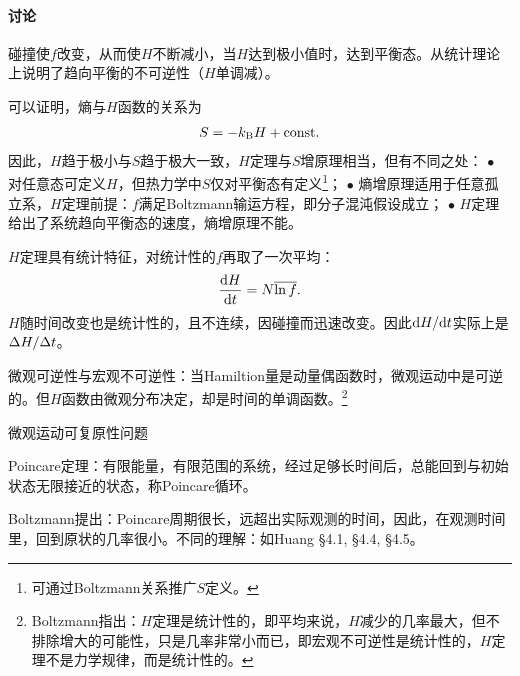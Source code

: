 \paragraph*{讨论}
\begin{compactenum}
	\item 碰撞使$f$改变，从而使$H$不断减小，当$H$达到极小值时，达到平衡态。从统计理论上说明了趋向平衡的不可逆性（$H$单调减）。
	\item 可以证明，熵与$H$函数的关系为
	\begin{align}
		S=-k_{\mathrm B} H+\mathrm{const}.
	\end{align}
	因此，$H$趋于极小与$S$趋于极大一致，$H$定理与$S$增原理相当，但有不同之处：
		\subitem $\bullet$ 对任意态可定义$H$，但热力学中$S$仅对平衡态有定义\footnote{可通过Boltzmann关系推广$S$定义。}；
		\subitem $\bullet$ 熵增原理适用于任意孤立系，$H$定理前提：$f$满足Boltzmann输运方程，即分子混沌假设成立；
		\subitem $\bullet$ $H$定理给出了系统趋向平衡态的速度，熵增原理不能。
	\item $H$定理具有统计特征，对统计性的$f$再取了一次平均：
	\[
		\frac{\mathrm{d}^{\;\!\!}H}{\mathrm{d} t^{\;\!\!}}=N\overline{\ln f}.
	\]
	$H$随时间改变也是统计性的，且不连续，因碰撞而迅速改变。因此$\mathop{}\!\mathrm{d} H/\mathrm{d} t$实际上是$\Delta H/\Delta t$。
	\item 微观可逆性与宏观不可逆性：当Hamiltion量是动量偶函数时，微观运动中是可逆的。但$H$函数由微观分布决定，却是时间的单调函数。\footnote{Boltzmann指出：$H$定理是统计性的，即平均来说，$H$减少的几率最大，但不排除增大的可能性，只是几率非常小而已，即宏观不可逆性是统计性的，$H$定理不是力学规律，而是统计性的。}	
	\item 微观运动可复原性问题
	
	Poincare定理：有限能量，有限范围的系统，经过足够长时间后，总能回到与初始状态无限接近的状态，称Poincare循环。

	Boltzmann提出：Poincare周期很长，远超出实际观测的时间，因此，在观测时间里，回到原状的几率很小。不同的理解：如Huang \S 4.1, \S 4.4, \S 4.5。
\end{compactenum}
